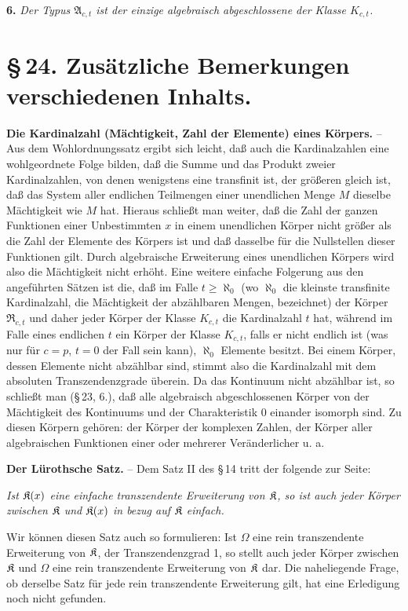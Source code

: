 \textbf{6.} \emph{Der Typus \(\mathfrak A_{c,t}\) ist der einzige algebraisch abgeschlossene der Klasse \(K_{c,t}\).}

\section*{\S\,24. Zusätzliche Bemerkungen verschiedenen Inhalts.}

\textbf{Die Kardinalzahl (Mächtigkeit, Zahl der Elemente) eines Körpers.} -- Aus dem Wohlordnungssatz ergibt sich leicht, daß auch die Kardinalzahlen eine wohlgeordnete Folge bilden, daß die Summe und das Produkt zweier Kardinalzahlen, von denen wenigstens eine transfinit ist, der größeren gleich ist, daß das System aller endlichen Teilmengen einer unendlichen Menge \(M\) dieselbe Mächtigkeit wie \(M\) hat. Hieraus schließt man weiter, daß die Zahl der ganzen Funktionen einer Unbestimmten \(x\) in einem unendlichen Körper nicht größer als die Zahl der Elemente des Körpers ist und daß dasselbe für die Nullstellen dieser Funktionen gilt. Durch algebraische Erweiterung eines unendlichen Körpers wird also die Mächtigkeit nicht erhöht. Eine weitere einfache Folgerung aus den angeführten Sätzen ist die, daß im Falle \(t\geq\aleph_0\) (wo \(\aleph_0\) die kleinste transfinite Kardinalzahl, die Mächtigkeit der abzählbaren Mengen, bezeichnet) der Körper \(\mathfrak R_{c,t}\) und daher jeder Körper der Klasse \(K_{c,t}\) die Kardinalzahl \(t\) hat, während im Falle eines endlichen \(t\) ein Körper der Klasse \(K_{c,t}\), falls er nicht endlich ist (was nur für \(c=p\), \(t=0\) der Fall sein kann), \(\aleph_0\) Elemente besitzt. Bei einem Körper, dessen Elemente nicht abzählbar sind, stimmt also die Kardinalzahl mit dem absoluten Transzendenzgrade überein. Da das Kontinuum nicht abzählbar ist, so schließt man (\S\,23, 6.), daß alle algebraisch abgeschlossenen Körper von der Mächtigkeit des Kontinuums und der Charakteristik 0 einander isomorph sind. Zu diesen Körpern gehören: der Körper der komplexen Zahlen, der Körper aller algebraischen Funktionen einer oder mehrerer Veränderlicher u. a.

\textbf{Der Lürothsche Satz.} -- Dem Satz II des \S\,14 tritt der folgende zur Seite:

\emph{Ist \(\mathfrak K(x)\) eine einfache transzendente Erweiterung von \(\mathfrak K\), so ist auch jeder Körper zwischen \(\mathfrak K\) und \(\mathfrak K(x)\) in bezug auf \(\mathfrak K\) einfach.}

Wir können diesen Satz auch so formulieren: Ist \(\Omega\) eine rein transzendente Erweiterung von \(\mathfrak K\), der Transzendenzgrad 1, so stellt auch jeder Körper zwischen \(\mathfrak K\) und \(\Omega\) eine rein transzendente Erweiterung von \(\mathfrak K\) dar. Die naheliegende Frage, ob derselbe Satz für jede rein transzendente Erweiterung gilt, hat eine Erledigung noch nicht gefunden.

